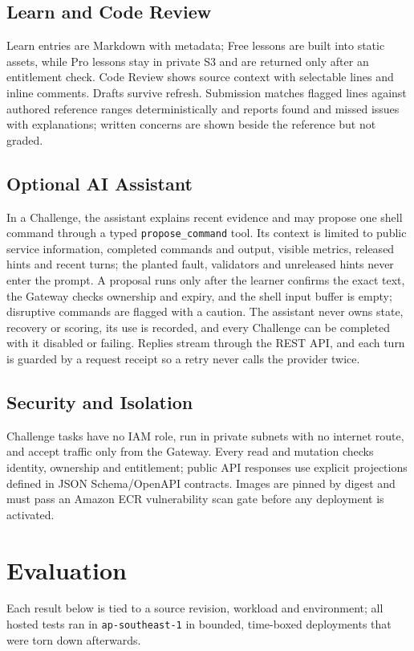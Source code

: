\documentclass[11pt,a4paper]{article}
\begin{document}
\subsection{Learn and Code Review}
Learn entries are Markdown with metadata; Free lessons are built into static
assets, while Pro lessons stay in private S3 and are returned only after an
entitlement check. Code Review shows source context with selectable lines and
inline comments. Drafts survive refresh. Submission matches flagged lines
against authored reference ranges deterministically and reports found and
missed issues with explanations; written concerns are shown beside the
reference but not graded.

\subsection{Optional AI Assistant}
In a Challenge, the assistant explains recent evidence and may propose one
shell command through a typed \texttt{propose\_command} tool. Its context is
limited to public service information, completed commands and output, visible
metrics, released hints and recent turns; the planted fault, validators and
unreleased hints never enter the prompt. A proposal runs only after the learner
confirms the exact text, the Gateway checks ownership and expiry, and the shell
input buffer is empty; disruptive commands are flagged with a caution. The
assistant never owns state, recovery or scoring, its use is recorded, and
every Challenge can be completed with it disabled or failing. Replies stream
through the REST API, and each turn is guarded by a request receipt so a retry
never calls the provider twice.

\subsection{Security and Isolation}
Challenge tasks have no IAM role, run in private subnets with no internet
route, and accept traffic only from the Gateway. Every read and mutation checks identity, ownership and entitlement;
public API responses use explicit projections defined in JSON Schema/OpenAPI
contracts. Images are pinned by digest and must pass an Amazon ECR vulnerability
scan gate before any deployment is activated.

\section{Evaluation}
\label{sec:eval}
Each result below is tied to a source revision, workload and environment; all
hosted tests ran in \texttt{ap-southeast-1} in bounded, time-boxed deployments
that were torn down afterwards.
\end{document}
